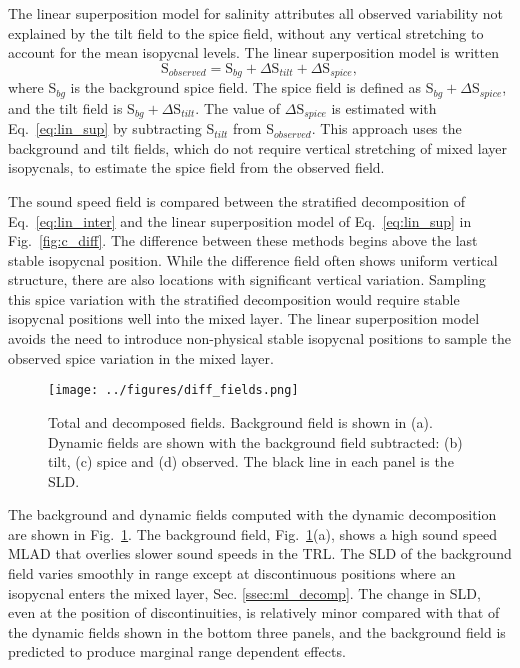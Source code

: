 \documentclass[preprint,NumberedRefs]{JASA}
\begin{document}
The linear superposition model for salinity attributes all observed variability not explained by the tilt field to the spice field, without any vertical stretching to account for the mean isopycnal levels. The linear superposition model is written
\begin{equation}
    \textrm{S}_{observed} = \textrm{S}_{bg} + \Delta \textrm{S}_{tilt} + \Delta \textrm{S}_{spice},
    \label{eq:lin_sup}
\end{equation}
where S$_{bg}$ is the background spice field. The spice field is defined as S$_{bg} + \Delta \textrm{S}_{spice}$, and the tilt field is S$_{bg} + \Delta \textrm{S}_{tilt}$. The value of $\Delta \textrm{S}_{spice}$ is estimated with Eq.~\eqref{eq:lin_sup} by subtracting S$_{tilt}$ from S$_{observed}$. This approach uses the background and tilt fields, which do not require vertical stretching of mixed layer isopycnals, to estimate the spice field from the observed field.

The sound speed field is compared between the stratified decomposition of Eq.~\eqref{eq:lin_inter} and the linear superposition model of Eq.~\eqref{eq:lin_sup} in Fig.~\ref{fig:c_diff}. The difference between these methods begins above the last stable isopycnal position. While the difference field often shows uniform vertical structure, there are also locations with significant vertical variation. Sampling this spice variation with the stratified decomposition would require stable isopycnal positions well into the mixed layer. The linear superposition model avoids the need to introduce non-physical stable isopycnal positions to sample the observed spice variation in the mixed layer.

\begin{figure}
\texttt{[image: ../figures/diff\_fields.png]}
        \caption{\label{fig:c_fields}{Total and decomposed fields. Background field is shown in (a). Dynamic fields are shown with the background field subtracted: (b) tilt, (c) spice and (d) observed. The black line in each panel is the SLD.}}
\end{figure}

The background and dynamic fields computed with the dynamic decomposition are shown in Fig.~\ref{fig:c_fields}. The background field, Fig.~\ref{fig:c_fields}(a), shows a high sound speed MLAD that overlies slower sound speeds in the TRL. The SLD of the background field varies smoothly in range except at discontinuous positions where an isopycnal enters the mixed layer, Sec. \ref{ssec:ml_decomp}. The change in SLD, even at the position of discontinuities, is relatively minor compared with that of the dynamic fields shown in the bottom three panels, and the background field is predicted to produce marginal range dependent effects.
\end{document}
